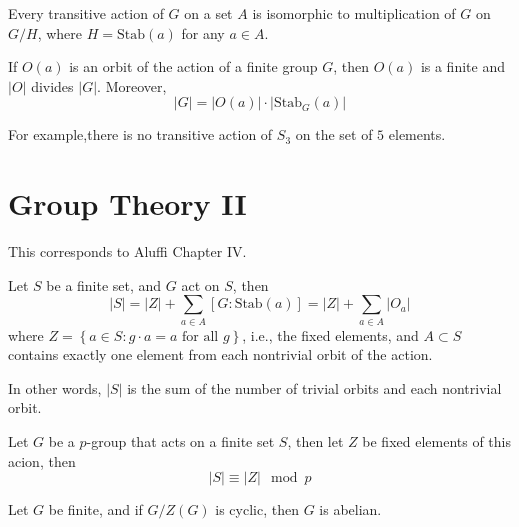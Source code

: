 \documentclass[openany]{book}
\begin{document}
\begin{prop}
    Every transitive action of $G$ on a set $A$ is isomorphic to multiplication of $G$ on $G/H$, where $H=\text{Stab}(a)$ for any $a\in A$.
\end{prop}


\begin{prop}
    If $O(a)$ is an orbit of the action of a finite group $G$, then $O(a)$ is a finite and $|O|$ divides $|G|$. Moreover, 
    \begin{equation*}
        |G|=|O(a)|\cdot|\text{Stab}_G(a)|
    \end{equation*}

    For example,there is no transitive action of $S_3$ on the set of $5$ elements. 
\end{prop}











\chapter{Group Theory II}
This corresponds to Aluffi Chapter IV.

\begin{prop}
    Let $S$ be a finite set, and $G$ act on $S$, then 
    \begin{equation*}
        |S|=|Z|+\sum_{a\in A}[G: \text{Stab}(a)]=|Z|+\sum_{a\in A}|O_a|
    \end{equation*} 
    where $Z=\left\{a\in S: g\cdot a=a\text{ for all } g\right\}$, i.e., the fixed elements, and $A\subset S$ contains exactly one element from each nontrivial orbit of the action. 
    
    In other words, $|S|$ is the sum of the number of trivial orbits and each nontrivial orbit.
\end{prop}

\begin{prop}
    Let $G$ be a $p$-group that acts on a finite set $S$, then let $Z$ be fixed elements of this acion, then 
    \begin{equation*}
        |S|\equiv |Z|\mod p
    \end{equation*}
\end{prop}


\begin{prop}
    Let $G$ be finite, and if $G/Z(G)$ is cyclic, then $G$ is abelian.
\end{prop}
\end{document}
